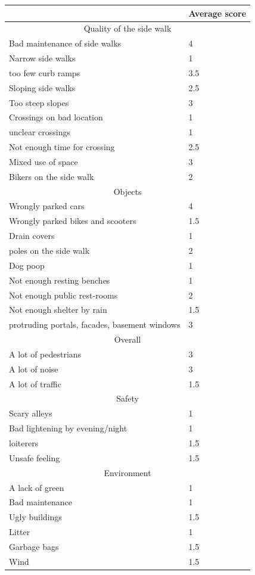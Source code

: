 \begin{appendix}
\begin{table}[h]
\begin{tabular}{|p{195pt}|p{195pt}|}
	\hline
	 & Average score \\
	\hline
	\multicolumn{2}{|c|}{Quality of the side walk} \\
	\hline
	Bad maintenance of side walks & 4 \\
	Narrow side walks & 1 \\
	too few curb ramps & 3.5 \\
	Sloping side walks & 2.5  \\
	Too steep slopes & 3 \\
	Crossings on bad location & 1 \\
	unclear crossings & 1 \\
	Not enough time for crossing & 2.5 \\
	Mixed use of space & 3 \\
	Bikers on the side walk & 2 \\
	\hline
	\multicolumn{2}{|c|}{Objects} \\
	\hline
	Wrongly parked cars & 4 \\
	Wrongly parked bikes and scooters & 1.5 \\
	Drain covers & 1 \\
	poles on the side walk & 2 \\
	Dog poop & 1 \\
	Not enough resting benches & 1 \\
	Not enough public rest-rooms & 2 \\
	Not enough shelter by rain & 1.5 \\
	protruding portals, facades, basement windows & 3 \\
	\hline
	\multicolumn{2}{|c|}{Overall} \\
	\hline   
	A lot of pedestrians & 3 \\
	A lot of noise & 3 \\
	A lot of traffic & 1.5 \\
	\hline
	\multicolumn{2}{|c|}{Safety} \\
	\hline
	Scary alleys & 1 \\
	Bad lightening by evening/night & 1 \\
	loiterers & 1.5 \\
	Unsafe feeling & 1.5 \\
	\hline
	\multicolumn{2}{|c|}{Environment} \\
	\hline 
	A lack of green & 1 \\
	Bad maintenance & 1 \\
	Ugly buildings & 1.5 \\
	Litter & 1 \\
	Garbage bags & 1.5 \\
	Wind & 1.5 \\
	\hline
\end{tabular}
\end{table}


\end{appendix}
